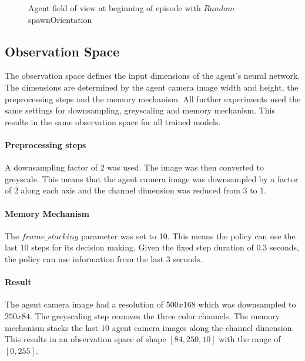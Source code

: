 \begin{figure}
    \centering
    \qquad
    \qquad
    \qquad
    \caption{Agent field of view at beginning of episode with $Random$ spawnOrientation}
    \label{fig:agent_field_of_view}
\end{figure}


\subsection{Observation Space}

The observation space defines the input dimensions of the agent's neural network. The dimensions are determined by the agent camera image width and height, the preprocessing steps and the memory mechanism. All further experiments used the same settings for downsampling, greyscaling and memory mechanism. This results in the same observation space for all trained models.

\paragraph{Preprocessing steps}
A downsampling factor of 2 was used. The image was then converted to greyscale. This means that the agent camera image was downsampled by a factor of 2 along each axis and the channel dimension was reduced from 3 to 1.

\paragraph{Memory Mechanism}
The $frame\_stacking$ parameter was set to 10. This means the policy can use the last 10 steps for its decision making. Given the fixed step duration of 0.3 seconds, the policy can use information from the last 3 seconds.

\paragraph{Result}

The agent camera image had a resolution of $500x168$ which was downsampled to $250x84$. The greyscaling step removes the three color channels. The memory mechanism stacks the last 10 agent camera images along the channel dimension. This results in an observation space of shape $[84, 250, 10]$ with the range of $[0, 255]$.

